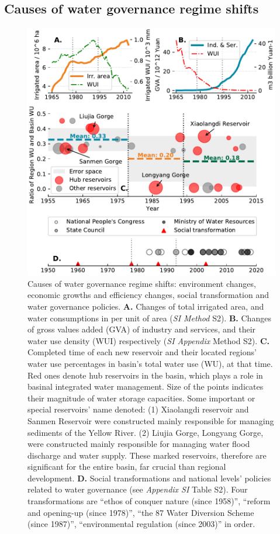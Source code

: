 \documentclass[9pt, twocolumn, twoside, lineno]{pnas-new}
\begin{document}
\subsection*{Causes of water governance regime shifts}
\label{result2}

\begin{figure}[th!]
	\centering
	\includegraphics[width=\linewidth]{../../figures/main/causes.pdf}
	\caption{
		Causes of water governance regime shifts: environment changes, economic growths and efficiency changes, social transformation and water governance policies.
		\textbf{A.} Changes of total irrigated area, and water consumptions in per unit of area (\textit{SI Method} S2).
		\textbf{B.} Changes of gross values added (GVA) of industry and services, and their water use density (WUI) respectively (\textit{SI Appendix} Method S2).
		\textbf{C.} Completed time of each new reservoir and their located regions' water use percentages in basin's total water use (WU), at that time. Red ones denote hub reservoirs in the basin, which plays a role in basinal integrated water management. Size of the points indicates their magnitude of water storage capacities. Some important or special reservoirs' name denoted: (1) Xiaolangdi reservoir and Sanmen Reservoir were constructed mainly responsible for managing sediments of the Yellow River. (2) Liujia Gorge, Longyang Gorge, were constructed mainly responsible for managing water flood discharge and water supply. These marked reservoirs, therefore are significant for the entire basin, far crucial than regional development.
		\textbf{D.} Social transformations and national levels' policies related to water governance (see \textit{Appendix SI} Table S2). Four transformations are ``ethos of conquer nature (since 1958)'', ``reform and opening-up (since 1978)'', ``the 87 Water Diversion Scheme (since 1987)'', ``environmental regulation (since 2003)'' in order.
	}
	\label{fig:Causes}
\end{figure}
\end{document}
